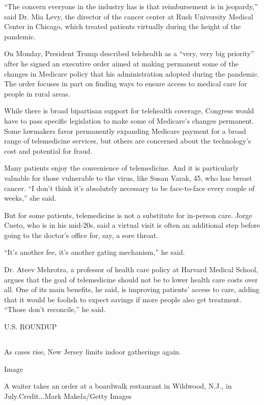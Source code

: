 ``The concern everyone in the industry has is that reimbursement is in
jeopardy,'' said Dr. Mia Levy, the director of the cancer center at Rush
University Medical Center in Chicago, which treated patients virtually
during the height of the pandemic.

On Monday, President Trump described telehealth as a ``very, very big
priority'' after he signed an executive order aimed at making permanent
some of the changes in Medicare policy that his administration adopted
during the pandemic. The order focuses in part on finding ways to ensure
access to medical care for people in rural areas.

While there is broad bipartisan support for telehealth coverage,
Congress would have to pass specific legislation to make some of
Medicare's changes permanent. Some lawmakers favor permanently expanding
Medicare payment for a broad range of telemedicine services, but others
are concerned about the technology's cost and potential for fraud.

Many patients enjoy the convenience of telemedicine. And it is
particularly valuable for those vulnerable to the virus, like Susan
Varak, 45, who has breast cancer. ``I don't think it's absolutely
necessary to be face-to-face every couple of weeks,'' she said.

But for some patients, telemedicine is not a substitute for in-person
care. Jorge Cueto, who is in his mid-20s, said a virtual visit is often
an additional step before going to the doctor's office for, say, a sore
throat.

``It's another fee, it's another gating mechanism,'' he said.

Dr. Ateev Mehrotra, a professor of health care policy at Harvard Medical
School, argues that the goal of telemedicine should not be to lower
health care costs over all. One of its main benefits, he said, is
improving patients' access to care, adding that it would be foolish to
expect savings if more people also get treatment. ``Those don't
reconcile,'' he said.

U.S. ROUNDUP

\hypertarget{-8}{%
\subsection{}\label{-8}}

As cases rise, New Jersey limits indoor gatherings again.

Image

A waiter takes an order at a boardwalk restaurant in Wildwood, N.J., in
July.Credit...Mark Makela/Getty Images


